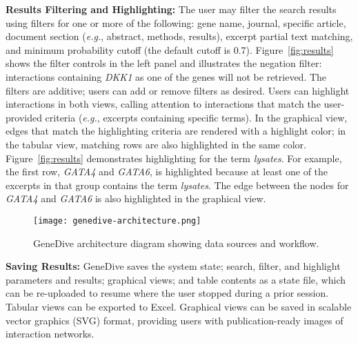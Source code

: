 \documentclass{ws-procs11x85}
\begin{document}
\noindent \textbf{Results Filtering and Highlighting:} The user may filter the search results using filters for one or more of the following: gene name, journal, specific article, document section (\textit{e.g.}, abstract, methods, results), excerpt partial text matching, and minimum probability cutoff (the default cutoff is 0.7). Figure~\ref{fig:results} shows the filter controls in the left panel and illustrates the negation filter: interactions containing \emph{DKK1} as one of the genes will not be retrieved.  The filters are additive; users can add or remove filters as desired. Users can highlight interactions in both views, calling attention to interactions that match the user-provided criteria (\textit{e.g.}, excerpts containing specific terms). In the graphical view, edges that match the highlighting criteria are rendered with a highlight color; in the tabular view, matching rows are also highlighted in the same color. Figure~\ref{fig:results} demonstrates highlighting for the term \emph{lysates}. For example, the first row, \emph{GATA4} and \emph{GATA6}, is highlighted because at least one of the excerpts in that group contains the term \emph{lysates}. The edge between the nodes for \emph{GATA4} and \emph{GATA6} is also highlighted in the graphical view. 

\begin{figure}
\centerline{
    \texttt{[image: genedive-architecture.png]}
}
\caption{GeneDive architecture diagram showing data sources and workflow.}
\label{fig:architecture}
\end{figure}


\noindent \textbf{Saving Results:} GeneDive saves the system state; search, filter,  and highlight parameters and results; graphical views; and table contents as a state file, which can be re-uploaded to resume where the user stopped during a prior session. Tabular views can be exported to Excel. Graphical views can be saved in scalable vector graphics (SVG) format, providing users with publication-ready images of interaction networks. \newline
\end{document}
